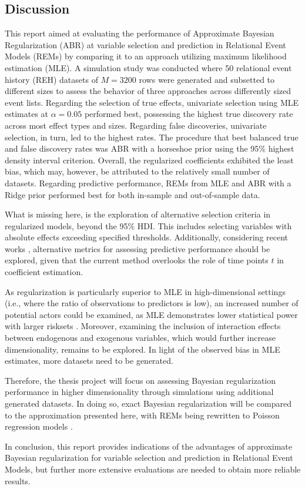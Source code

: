 \documentclass{article}
\begin{document}
\begin{spacing}{2}
\begin{justify}
\section{Discussion}

This report aimed at evaluating the performance of Approximate Bayesian Regularization (ABR) at variable selection and prediction in Relational Event Models (REMs) by comparing it to an approach utilizing maximum likelihood estimation (MLE). A simulation study was conducted where 50 relational event history (REH) datasets of $M=3200$ rows were generated and subsetted to different sizes to assess the behavior of three approaches across differently sized event lists. Regarding the selection of true effects, univariate selection using MLE estimates at $\alpha=0.05$ performed best, possessing the highest true discovery rate across most effect types and sizes. Regarding false discoveries, univariate selection, in turn, led to the highest rates. The procedure that best balanced true and false discovery rates was ABR with a horseshoe prior using the 95\% highest density interval criterion. Overall, the regularized coefficients exhibited the least bias, which may, however, be attributed to the relatively small number of datasets. Regarding predictive performance, REMs from MLE and ABR with a Ridge prior performed best for both in-sample and out-of-sample data.

What is missing here, is the exploration of alternative selection criteria in regularized models, beyond the 95\% HDI. This includes selecting variables with absolute effects exceeding specified thresholds. Additionally, considering recent works \citep{Amati2024, Boschi2024}, alternative metrics for assessing predictive performance should be explored, given that the current method overlooks the role of time points $t$ in coefficient estimation.

As regularization is particularly superior to MLE in high-dimensional settings (i.e., where the ratio of observations to predictors is low), an increased number of potential actors could be examined, as MLE demonstrates lower statistical power with larger risksets \citep{Schecter2020}. Moreover, examining the inclusion of interaction effects between endogenous and exogenous variables, which would further increase dimensionality, remains to be explored. In light of the observed bias in MLE estimates, more datasets need to be generated.

Therefore, the thesis project will focus on assessing Bayesian regularization performance in higher dimensionality through simulations using additional generated datasets. In doing so, exact Bayesian regularization will be compared to the approximation presented here, with REMs being rewritten to Poisson regression models \citep{Vieira2024}.

In conclusion, this report provides indications of the advantages of approximate Bayesian regularization for variable selection and prediction in Relational Event Models, but further more extensive evaluations are needed to obtain more reliable results.


\end{justify}
\end{spacing}

\newpage



\end{document}
